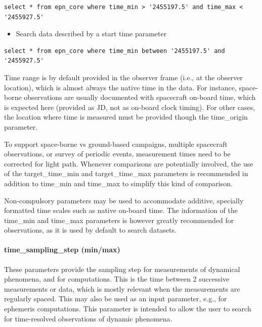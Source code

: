 \documentclass[11pt,a4paper]{ivoa}
\begin{document}
\begin{verbatim}
select * from epn_core where time_min > '2455197.5' and time_max < '2455927.5'
\end{verbatim}




\begin{itemize}
\item Search data described by a start time parameter
\end{itemize}






\begin{verbatim}
select * from epn_core where time_min between '2455197.5' and '2455927.5'
\end{verbatim}




Time range is by default provided in the observer frame (i.e., at the observer location), which is almost always the native time in the data. For instance, space-borne observations are usually documented with spacecraft on-board time, which is expected here (provided as JD, not as on-board clock timing). For other cases, the location where time is measured must be provided though the time\_origin parameter.

To support space-borne vs ground-based campaigns, multiple spacecraft observations, or survey of periodic events, measurement times need to be corrected for light path. Whenever comparisons are potentially involved, the use of the target\_time\_min and target\_time\_max parameters is recommended in addition to time\_min and time\_max to simplify this kind of comparison.

Non-compulsory parameters may be used to accommodate additive, specially formatted time scales such as native on-board time. The information of the time\_min and time\_max parameters is however greatly recommended for observations, as it is used by default to search datasets.

\paragraph{time\_sampling\_step (min/max)}

These parameters provide the sampling step for measurements of dynamical phenomena, and for computations. This is the time between 2 successive measurements or data, which is mostly relevant when the measurements are regularly spaced. This may also be used as an input parameter, e.g., for ephemeris computations. This parameter is intended to allow the user to search for time-resolved observations of dynamic phenomena.
\end{document}
